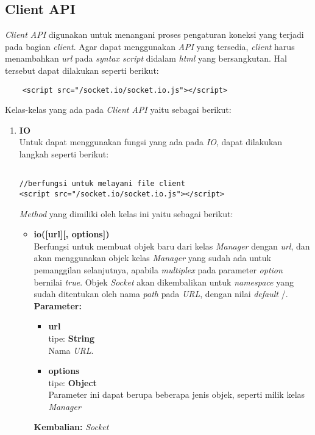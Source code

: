 \subsection{Client API}
\textit{Client API} digunakan untuk menangani proses pengaturan koneksi yang terjadi pada bagian \textit{client}\cite{rauch:11:socketioclientapi}. Agar dapat menggunakan \textit{API} yang tersedia, \textit{client} harus menambahkan \textit{url} pada \textit{syntax script} didalam \textit{html} yang bersangkutan. Hal tersebut dapat dilakukan seperti berikut:

\begin{lstlisting}
	<script src="/socket.io/socket.io.js"></script>
\end{lstlisting}

Kelas-kelas yang ada pada \textit{Client API} yaitu sebagai berikut:
\begin{enumerate}
	\item \textbf{IO} \\
	Untuk dapat menggunakan fungsi yang ada pada \textit{IO}, dapat dilakukan langkah seperti berikut:
\begin{lstlisting}
	
//berfungsi untuk melayani file client
<script src="/socket.io/socket.io.js"></script>
\end{lstlisting}

	
	\textit{Method} yang dimiliki oleh kelas ini yaitu sebagai berikut:
	\begin{itemize}
		\item \textbf{io([url][, options])} \\
		Berfungsi untuk membuat objek baru dari kelas \textit{Manager} dengan \textit{url}, dan akan menggunakan objek kelas \textit{Manager} yang sudah ada untuk pemanggilan selanjutnya, apabila \textit{multiplex} pada parameter \textit{option} bernilai \textit{true}. Objek \textit{Socket} akan dikembalikan untuk \textit{namespace} yang sudah ditentukan oleh nama \textit{path} pada \textit{URL}, dengan nilai \textit{default} /. \\
		\textbf{Parameter:}
		\begin{itemize}
			\item \textbf{url} \\tipe: \textbf{String} \\ Nama \textit{URL}.
			\item \textbf{options} \\tipe: \textbf{Object} \\ Parameter ini dapat berupa beberapa jenis objek, seperti milik kelas \textit{Manager}
		\end{itemize}
		\textbf{Kembalian:} \textit{Socket}
		

\end{itemize}
\end{enumerate}
